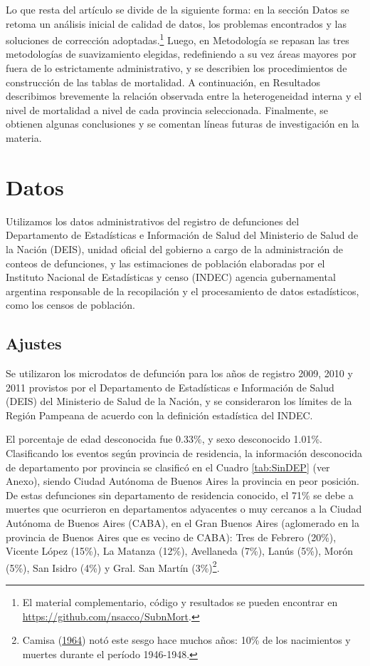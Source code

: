 \documentclass[12pt,spanish,]{article}
\begin{document}
Lo que resta del artículo se divide de la siguiente forma: en la sección
Datos se retoma un análisis inicial de calidad de datos, los problemas
encontrados y las soluciones de corrección adoptadas.\footnote{El
  material complementario, código y resultados se pueden encontrar en
  \url{https://github.com/nsacco/SubnMort}.} Luego, en Metodología se
repasan las tres metodologías de suavizamiento elegidas, redefiniendo a
su vez áreas mayores por fuera de lo estrictamente administrativo, y se
describien los procedimientos de construcción de las tablas de
mortalidad. A continuación, en Resultados describimos brevemente la
relación observada entre la heterogeneidad interna y el nivel de
mortalidad a nivel de cada provincia seleccionada. Finalmente, se
obtienen algunas conclusiones y se comentan líneas futuras de
investigación en la materia.

\hypertarget{datos}{%
\section{Datos}\label{datos}}

Utilizamos los datos administrativos del registro de defunciones del
Departamento de Estadísticas e Información de Salud del Ministerio de
Salud de la Nación (DEIS), unidad oficial del gobierno a cargo de la
administración de conteos de defunciones, y las estimaciones de
población elaboradas por el Instituto Nacional de Estadísticas y censo
(INDEC) agencia gubernamental argentina responsable de la recopilación y
el procesamiento de datos estadísticos, como los censos de población.

\hypertarget{ajustes}{%
\subsection{Ajustes}\label{ajustes}}

Se utilizaron los microdatos de defunción para los años de registro
2009, 2010 y 2011 provistos por el Departamento de Estadísticas e
Información de Salud (DEIS) del Ministerio de Salud de la Nación, y se
consideraron los límites de la Región Pampeana de acuerdo con la
definición estadística del INDEC.

El porcentaje de edad desconocida fue 0.33\%, y sexo desconocido 1.01\%.
Clasificando los eventos según provincia de residencia, la información
desconocida de departamento por provincia se clasificó en el Cuadro
\ref{tab:SinDEP} (ver Anexo), siendo Ciudad Autónoma de Buenos Aires la
provincia en peor posición. De estas defunciones sin departamento de
residencia conocido, el 71\% se debe a muertes que ocurrieron en
departamentos adyacentes o muy cercanos a la Ciudad Autónoma de Buenos
Aires (CABA), en el Gran Buenos Aires (aglomerado en la provincia de
Buenos Aires que es vecino de CABA): Tres de Febrero (20\%), Vicente
López (15\%), La Matanza (12\%), Avellaneda (7\%), Lanús (5\%), Morón
(5\%), San Isidro (4\%) y Gral. San Martín (3\%)\footnote{Camisa
  (\protect\hyperlink{ref-Camisa1964}{1964}) notó este sesgo hace muchos
  años: 10\% de los nacimientos y muertes durante el período 1946-1948.}.
\end{document}
